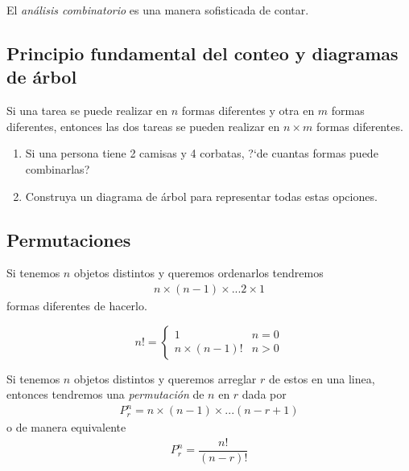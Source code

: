 {}
El \emph{análisis combinatorio} es una manera sofisticada de contar.


\subsection{Principio fundamental del conteo y diagramas de árbol}

Si una tarea se puede realizar en $n$ formas diferentes y otra en $m$ formas diferentes, entonces las dos tareas se pueden realizar en $n\times m$ formas diferentes.


{}
\begin{ejemplo}
 \label{exmp:1.14}
\end{ejemplo}
 \begin{enumerate}
  \item Si una persona tiene 2 camisas y 4 corbatas, ?`de cuantas formas puede combinarlas?
  \item Construya un diagrama de árbol para representar todas estas opciones.
 \end{enumerate}



\subsection{Permutaciones}
{}
Si tenemos $n$ objetos distintos y queremos ordenarlos tendremos
\begin{align*}
n \times (n-1) \times ... 2\times 1
\end{align*} formas diferentes de hacerlo.

{}
\begin{defn}[$n$ factorial]
 \begin{equation}
n! = \begin{cases}
     1 & n=0 \\
     n\times(n-1)! & n>0
    \end{cases}
\end{equation}

\end{defn}


{}
 Si tenemos $n$ objetos distintos y queremos arreglar $r$ de estos en una linea, entonces tendremos una \emph{permutación} de $n$ en $r$ dada por
 \begin{align}
  \label{1.25}
  P^{n}_{r}=n\times(n-1)\times...\left( n-r+1 \right)
 \end{align} 
o de manera equivalente
\begin{align}
 \label{1.27}
 P^{n}_{r}=\dfrac{n!}{(n-r)!}
\end{align}


